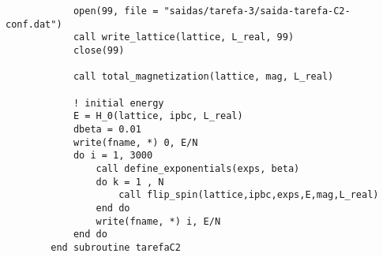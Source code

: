 \begin{verbatim}
            open(99, file = "saidas/tarefa-3/saida-tarefa-C2-conf.dat")
            call write_lattice(lattice, L_real, 99)
            close(99)

            call total_magnetization(lattice, mag, L_real)

            ! initial energy
            E = H_0(lattice, ipbc, L_real)
            dbeta = 0.01
            write(fname, *) 0, E/N
            do i = 1, 3000
                call define_exponentials(exps, beta)
                do k = 1 , N
                    call flip_spin(lattice,ipbc,exps,E,mag,L_real)
                end do   
                write(fname, *) i, E/N
            end do
        end subroutine tarefaC2
\end{verbatim}